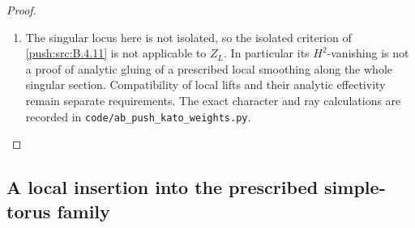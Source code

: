 \begin{proof}
\begin{enumerate}[label=\arabic*.,leftmargin=*]
\item The singular locus here is not isolated, so the isolated
criterion of \ref{push:src:B.4.11} is not applicable to $Z_L$.
In particular its $H^2$-vanishing is not a proof of analytic
gluing of a prescribed local smoothing along the whole
singular section.  Compatibility of local lifts and their
analytic effectivity remain separate requirements.
The exact character and ray calculations are recorded in
\texttt{code/ab\_push\_kato\_weights.py}.
\end{enumerate}
\end{proof}

\subsection{A local insertion into the prescribed simple-torus family}

